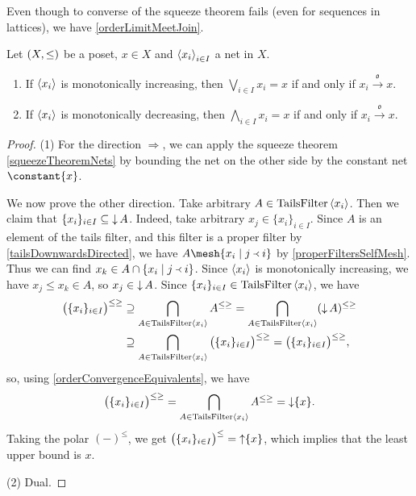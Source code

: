 Even though to converse of the squeeze theorem fails (even for sequences in lattices), we have \ref{orderLimitMeetJoin}.

\begin{proposition} \label{netMonotoneConvergence}
Let $\sSet{X,\leq}$ be a poset, $x\in X$ and $\left\langle x_i \right\rangle_{i\in I}$ a net in $X$.
\begin{enumerate}
\item If $\left\langle x_i \right\rangle$ is monotonically increasing, then $\bigvee_{i\in I}x_i = x$ \textup{if and only if} $x_i \overset{\mathfrak{o}}{\longrightarrow} x$.
\item If $\left\langle x_i \right\rangle$ is monotonically decreasing, then $\bigwedge_{i\in I}x_i = x$ \textup{if and only if} $x_i \overset{\mathfrak{o}}{\longrightarrow} x$.
\end{enumerate}
\end{proposition}
\begin{proof}
(1) For the direction $\Rightarrow$, we can apply the squeeze theorem \ref{squeezeTheoremNets} by bounding the net on the other side by the constant net $\constant{x}$.

We now prove the other direction. Take arbitrary $A\in\operatorname{TailsFilter}\left\langle x_i \right\rangle$. Then we claim that $\{x_i\}_{i\in I} \subseteq \operatorname{\downarrow} A$. Indeed, take arbitrary $x_j\in \{x_i\}_{i\in I}$. Since $A$ is an element of the tails filter, and this filter is a proper filter by \ref{tailsDownwardsDirected}, we have $A\mesh \setbuilder{x_i}{j \Yleft i}$ by \ref{properFiltersSelfMesh}. Thus we can find $x_k \in A\cap \setbuilder{x_i}{j \Yleft i}$. Since $\left\langle x_i \right\rangle$ is monotonically increasing, we have $x_j \leq x_k \in A$, so $x_j \in \operatorname{\downarrow} A$. Since $\{x_i\}_{i\in I} \in \operatorname{TailsFilter}\left\langle x_i \right\rangle$, we have
\begin{align*}
\big(\{x_i\}_{i\in I}\big)^{\leq\geq} &\supseteq \bigcap_{A\in \operatorname{TailsFilter}\left\langle x_i \right\rangle}A^{\leq\geq} = \bigcap_{A\in \operatorname{TailsFilter}\left\langle x_i \right\rangle}(\operatorname{\downarrow} A)^{\leq\geq} \\
&\supseteq \bigcap_{A\in \operatorname{TailsFilter}\left\langle x_i \right\rangle}\big(\{x_i\}_{i\in I}\big)^{\leq\geq} = \big(\{x_i\}_{i\in I}\big)^{\leq\geq},
\end{align*}
so, using \ref{orderConvergenceEquivalents}, we have
\[ \big(\{x_i\}_{i\in I}\big)^{\leq\geq} = \bigcap_{A\in \operatorname{TailsFilter}\left\langle x_i \right\rangle}A^{\leq\geq} = \operatorname{\downarrow}\{x\}. \]
Taking the polar $(-)^\leq$, we get $\big(\{x_i\}_{i\in I}\big)^{\leq} = \operatorname{\uparrow}\{x\}$, which implies that the least upper bound is $x$.

(2) Dual.
\end{proof}

